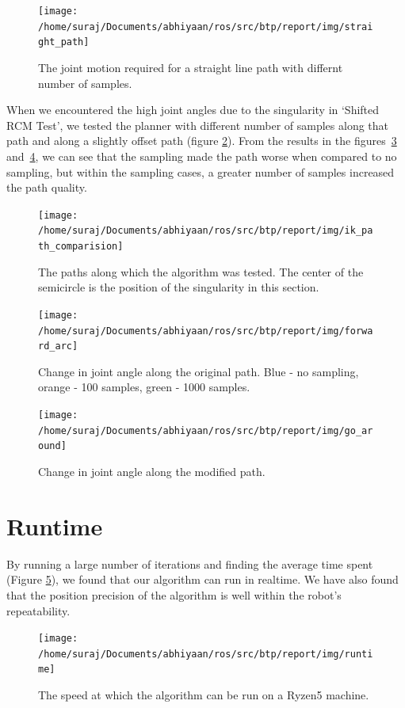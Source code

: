 \documentclass[BTech]{iitmdiss}
\begin{document}
    \begin{figure}
        \centering
        \texttt{[image: /home/suraj/Documents/abhiyaan/ros/src/btp/report/img/straight\_path]}
        \caption{The joint motion required for a straight line path with differnt number of samples.}
        \label{fig:straight_path}
    \end{figure}

    When we encountered the high joint angles due to the singularity in `Shifted RCM Test', we tested the planner with
    different number of samples along that path and along a slightly offset path (figure \ref{fig:ikpaths}).
    From the results in the figures~\ref{fig:forward_arc} and~\ref{fig:go_around},
    we can see that the sampling made the path worse when compared to no sampling,
    but within the sampling cases, a greater number of samples increased the path quality.

    \begin{figure}
        \centering
        \texttt{[image: /home/suraj/Documents/abhiyaan/ros/src/btp/report/img/ik\_path\_comparision]}
        \caption{The paths along which the algorithm was tested. The center of the semicircle is the position of the singularity in this section.}
        \label{fig:ikpaths}
    \end{figure}

    \begin{figure}
        \centering
        \texttt{[image: /home/suraj/Documents/abhiyaan/ros/src/btp/report/img/forward\_arc]}
        \caption{Change in joint angle along the original path. Blue - no sampling, orange - 100 samples, green - 1000 samples.}
        \label{fig:forward_arc}
    \end{figure}

    \begin{figure}
        \centering
        \texttt{[image: /home/suraj/Documents/abhiyaan/ros/src/btp/report/img/go\_around]}
        \caption{Change in joint angle along the modified path.}
        \label{fig:go_around}
    \end{figure}


    \section{Runtime}

    By running a large number of iterations and finding the average time spent (Figure \ref{fig:runtime}), we found that our algorithm can run in
    realtime.
    We have also found that the position precision of the algorithm is well within the robot's repeatability.
    \begin{figure}
        \centering
        \texttt{[image: /home/suraj/Documents/abhiyaan/ros/src/btp/report/img/runtime]}
        \caption{The speed at which the algorithm can be run on a Ryzen5 machine.}
        \label{fig:runtime}
    \end{figure}
\end{document}

